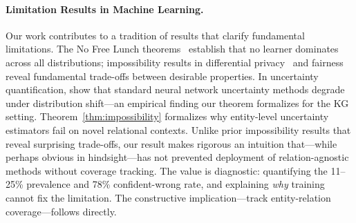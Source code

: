 \paragraph{Limitation Results in Machine Learning.}
Our work contributes to a tradition of results that clarify fundamental limitations. The No Free Lunch theorems~\citep{wolpert1997nfl} establish that no learner dominates across all distributions; impossibility results in differential privacy~\citep{dwork2014algorithmic} and fairness~\citep{kleinberg2017inherent} reveal fundamental trade-offs between desirable properties. In uncertainty quantification, \citet{ovadia2019can} show that standard neural network uncertainty methods degrade under distribution shift---an empirical finding our theorem formalizes for the KG setting. Theorem~\ref{thm:impossibility} formalizes why entity-level uncertainty estimators fail on novel relational contexts. Unlike prior impossibility results that reveal surprising trade-offs, our result makes rigorous an intuition that---while perhaps obvious in hindsight---has not prevented deployment of relation-agnostic methods without coverage tracking. The value is diagnostic: quantifying the 11--25\% prevalence and 78\% confident-wrong rate, and explaining \emph{why} training cannot fix the limitation. The constructive implication---track entity-relation coverage---follows directly.
